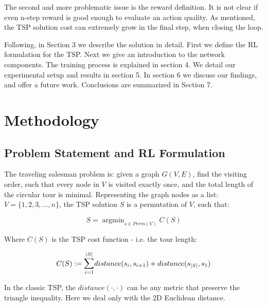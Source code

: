 \documentclass[10pt,a4paper,draft]{article}
\DeclareMathOperator*{\argmin}{argmin}
\begin{document}
The second and more problematic issue is the reward definition. It is not clear if even n-step reward is good enough to evaluate an action quality. As mentioned, the TSP solution cost can extremely grow in the final step, when closing the loop.

Following, in Section 3 we describe the solution in detail. First we define the RL formulation for the TSP. Next we give an introduction to the network components. The training process is explained in section 4. We detail our experimental setup and results in section 5. In section 6 we discuss our findings, and offer a future work. Conclusions are summarized in Section 7.

\section{Methodology}
\subsection{Problem Statement and RL Formulation}
The traveling salesman problem is: given a graph $G(V,E)$, find the visiting order, such that every node in $V$ is visited exactly once, and the total length of the circular tour is minimal. Representing the graph nodes as a list: $V = \{1,2,3,...,n\}$, the TSP solution $S$ is a permutation of $V$, such that:

\begin{equation} \label{tsp_statement}
	S = \argmin_{s \in Perm(V)} C(S)
\end{equation}

Where $C(S)$ is the TSP cost function - i.e. the tour length:

\begin{equation}  \label{tsp_cost}
	C(S) := \mathlarger{\sum}_{i=1}^{|S|}{distance(s_i, s_{i+1})} + distance(s_{|S|}, s_1)
\end{equation}

In the classic TSP, the $distance(\cdot,\cdot)$ can be any metric that preserve the triangle inequality. Here we deal only with the 2D Euclidean distance. 
\end{document}
